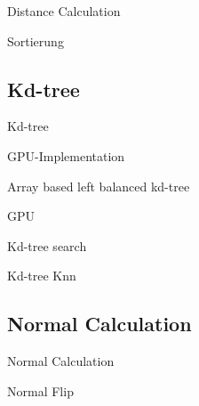 \documentclass{beamer}
\begin{document}
\begin{frame}{Distance Calculation}
\end{frame}

\begin{frame}{Sortierung}
 
 
 
\end{frame}

\subsection*{Kd-tree}
\begin{frame}{Kd-tree}
 
\end{frame}

\begin{frame}{GPU-Implementation}
 
\end{frame}

\begin{frame}{Array based left balanced kd-tree}
 
\end{frame}

\begin{frame}{GPU}
 
\end{frame}

\begin{frame}{Kd-tree search}
 
\end{frame}

\begin{frame}{Kd-tree Knn}
 
\end{frame}

\subsection*{Normal Calculation}
\begin{frame}{Normal Calculation}
 
\end{frame}

\begin{frame}{Normal Flip}
 
\end{frame}
\end{document}
